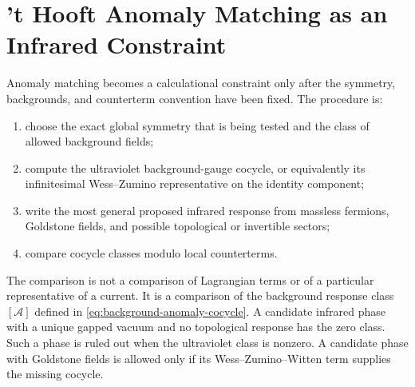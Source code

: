 \section{'t Hooft Anomaly Matching as an Infrared Constraint}
\label{sec:t-hooft-anomaly-matching-tool}

Anomaly matching becomes a calculational constraint only after the symmetry,
backgrounds, and counterterm convention have been fixed.  The procedure is:
\begin{enumerate}[label=\roman*.]
\item choose the exact global symmetry that is being tested and the class of
allowed background fields;
\item compute the ultraviolet background-gauge cocycle, or equivalently its
infinitesimal Wess--Zumino representative on the identity component;
\item write the most general proposed infrared response from massless
fermions, Goldstone fields, and possible topological or invertible sectors;
\item compare cocycle classes modulo local counterterms.
\end{enumerate}
The comparison is not a comparison of Lagrangian terms or of a particular
representative of a current.  It is a comparison of the background response
class \([\mathcal A]\) defined in \eqref{eq:background-anomaly-cocycle}.  A
candidate infrared phase with a unique gapped vacuum and no topological
response has the zero class.  Such a phase is ruled out when the ultraviolet
class is nonzero.  A candidate phase with Goldstone fields is allowed only if
its Wess--Zumino--Witten term supplies the missing cocycle.

